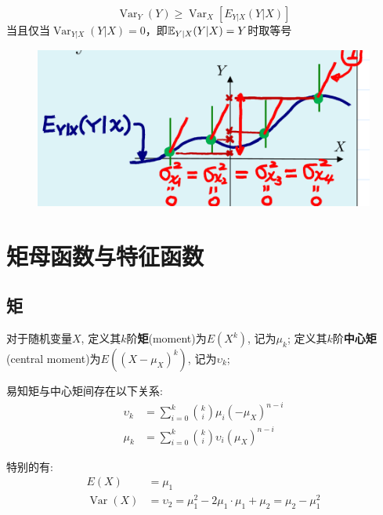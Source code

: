 \begin{corollary}
    \[ \operatorname{Var}_Y(Y) \ge \operatorname{Var}_X[E_{Y|X}(Y|X)] \]
    当且仅当$\operatorname{Var}_{Y|X}(Y|X)=0$，即$\mathbb{E}_{Y|X}(Y|X)=Y$时取等号
\end{corollary}

\begin{figure}
    \centering
    \includegraphics{image/var_dec3.png}
\end{figure}

\section{矩母函数与特征函数}

\subsection{矩}

\begin{definition}
    对于随机变量$X$, 定义其$k$阶\textbf{矩}(moment)为$E(X^k)$, 记为$\mu_k$; 定义其$k$阶\textbf{中心矩}(central moment)为$E((X-\mu_X)^k)$, 记为$\upsilon_k$;
\end{definition}

易知矩与中心矩间存在以下关系:
\begin{align*}
    \upsilon_k & =\sum_{i=0}^k \binom{k}{i} \mu_i (-\mu_X)^{n-i}     \\
    \mu_k      & =\sum_{i=0}^k \binom{k}{i} \upsilon_i (\mu_X)^{n-i}
\end{align*}

特别的有:
\begin{align*}
    E(X)                  & =\mu_1                                                         \\
    \operatorname{Var}(X) & =\upsilon_2=\mu_1^2-2\mu_1 \cdot \mu_1 + \mu_2 = \mu_2-\mu_1^2
\end{align*}

